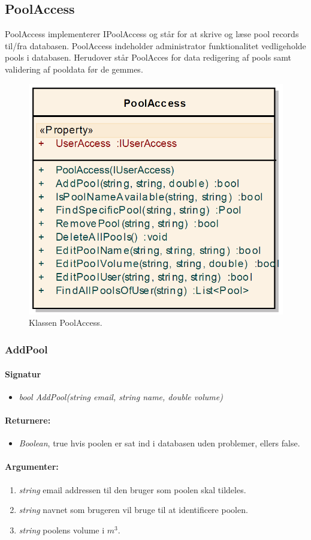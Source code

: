 \subsection{PoolAccess}
PoolAccess implementerer IPoolAccess og står for at skrive og læse pool records til/fra databasen. PoolAccess indeholder administrator funktionalitet vedligeholde pools i databasen. Herudover står PoolAcces for data redigering af pools samt validering af pooldata før de gemmes.

\begin{figure}
\centering
\includegraphics[width=0.46\linewidth]{figs/implementering/poolAccessClass.PNG}
\caption{Klassen PoolAccess.}
\label{fig:poolAccessClass}
\end{figure}

\subsubsection{AddPool}%

\paragraph{Signatur}
\begin{itemize}
	\item \textit{bool AddPool(string email, string name, double volume)}
\end{itemize}

\paragraph{Returnere:}
\begin{itemize}
	\item \textit{Boolean}, true hvis poolen er sat ind i databasen uden problemer, ellers false.
\end{itemize}

\paragraph{Argumenter:}
\begin{enumerate}
	\item \textit{string} email addressen til den bruger som poolen skal tildeles.
	\item \textit{string} navnet som brugeren vil bruge til at identificere poolen.
	\item \textit{string} poolens volume i $m^3$.
\end{enumerate}

